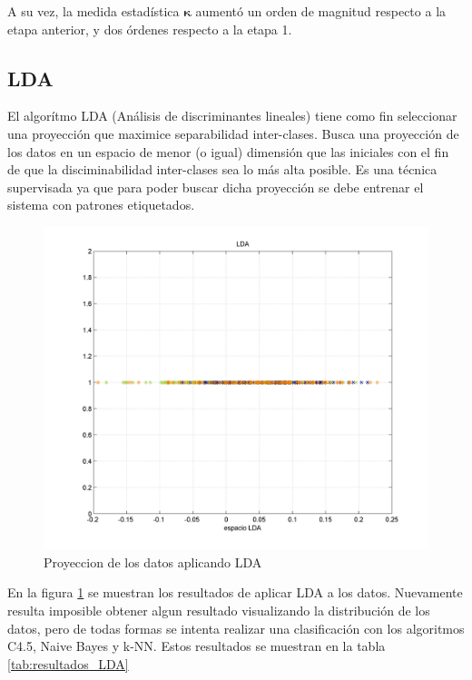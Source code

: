 \documentclass[12pt,a4paper,titlepage]{report}
\newcommand{\bs}{\boldsymbol}
\begin{document}
A su vez, la medida estadística $\bs\kappa$ aumentó un orden de magnitud respecto a la etapa anterior, y dos órdenes respecto a la etapa 1.

\subsection{LDA}
El algorítmo LDA (Análisis de discriminantes lineales) tiene como fin seleccionar una proyección que maximice separabilidad inter-clases. Busca una proyección de los datos en un espacio de menor (o igual) dimensión que las iniciales con el fin de que la disciminabilidad inter-clases sea lo más alta posible. Es una técnica supervisada ya que para poder buscar dicha proyección se debe entrenar el sistema con patrones etiquetados.\\

\begin{figure}
	\centering 
	\includegraphics[width=.8\textwidth]{pics/lda2}
	\caption{Proyeccion de los datos aplicando LDA}
	\label{fig:lda}
\end{figure}

En la figura \ref{fig:lda} se muestran los resultados de aplicar LDA a los datos. Nuevamente resulta imposible obtener algun resultado visualizando la distribución de los datos, pero de todas formas se intenta realizar una clasificación con los algoritmos C4.5, Naive Bayes y k-NN. Estos resultados se muestran en la tabla \ref{tab:resultados_LDA}
\end{document}
